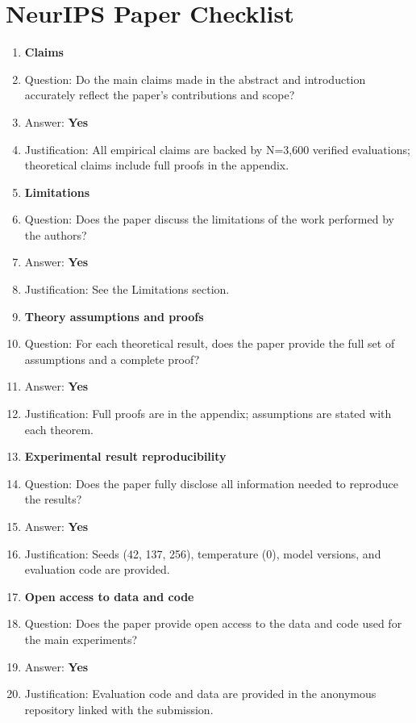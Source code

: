 \documentclass{article}
\newcommand{\answerYes}[1][]{\textbf{Yes}}
\begin{document}
\section*{NeurIPS Paper Checklist}

\begin{enumerate}
\item {\bf Claims}
    \item[] Question: Do the main claims made in the abstract and introduction accurately reflect the paper's contributions and scope?
    \item[] Answer: \answerYes{}
    \item[] Justification: All empirical claims are backed by N=3,600 verified evaluations; theoretical claims include full proofs in the appendix.

\item {\bf Limitations}
    \item[] Question: Does the paper discuss the limitations of the work performed by the authors?
    \item[] Answer: \answerYes{}
    \item[] Justification: See the Limitations section.

\item {\bf Theory assumptions and proofs}
    \item[] Question: For each theoretical result, does the paper provide the full set of assumptions and a complete proof?
    \item[] Answer: \answerYes{}
    \item[] Justification: Full proofs are in the appendix; assumptions are stated with each theorem.

\item {\bf Experimental result reproducibility}
    \item[] Question: Does the paper fully disclose all information needed to reproduce the results?
    \item[] Answer: \answerYes{}
    \item[] Justification: Seeds (42, 137, 256), temperature (0), model versions, and evaluation code are provided.

\item {\bf Open access to data and code}
    \item[] Question: Does the paper provide open access to the data and code used for the main experiments?
    \item[] Answer: \answerYes{}
    \item[] Justification: Evaluation code and data are provided in the anonymous repository linked with the submission.


\end{enumerate}
\end{document}
